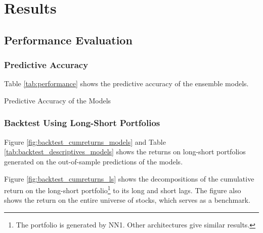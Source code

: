 \chapter{Results}
\label{chap:res}

\section{Performance Evaluation}

	\subsection{Predictive Accuracy}
	
		Table \ref{tab:performance} shows the predictive accuracy of the ensemble models. 		
			\begin{table}
				\centering
				
				\caption{Predictive Accuracy of the Models}
				\label{tab:performance}
			\end{table}

	\subsection{Backtest Using Long-Short Portfolios}
		\label{chap:backtest}
	
		Figure \ref{fig:backtest_cumreturns_models} and Table \ref{tab:backtest_descriptives_models} shows the returns on long-short portfolios generated on the out-of-sample predictions of the models.
		
		
	
		Figure \ref{fig:backtest_cumreturns_ls} shows the decompositions of the cumulative return on the long-short portfolio\footnote{The portfolio is generated by NN1. Other architectures give similar results.} to its long and short lags. The figure also shows the return on the entire universe of stocks, which serves as a benchmark.  
			
